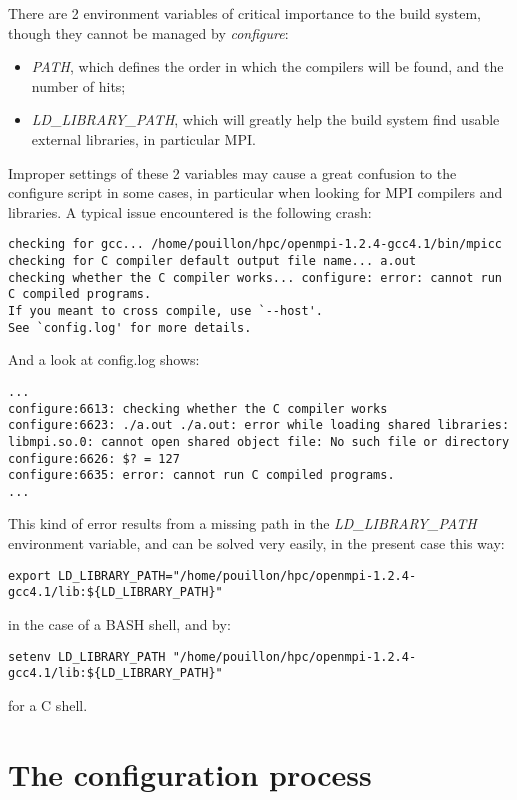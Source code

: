 There are 2 environment variables of critical importance to the build
system, though they cannot be managed by \textit{configure}: 
\begin{itemize}
\item \textit{PATH}, which defines the order in which the compilers will
be found, and the number of hits; 
\item \textit{LD\_LIBRARY\_PATH}, which will greatly help the build system
find usable external libraries, in particular MPI. 
\end{itemize}
Improper settings of these 2 variables may cause a great confusion
to the configure script in some cases, in particular when looking
for MPI compilers and libraries. A typical issue encountered is the
following crash:{\scriptsize
\begin{verbatim}
checking for gcc... /home/pouillon/hpc/openmpi-1.2.4-gcc4.1/bin/mpicc
checking for C compiler default output file name... a.out
checking whether the C compiler works... configure: error: cannot run C compiled programs.
If you meant to cross compile, use `--host'.
See `config.log' for more details.
\end{verbatim}
}And a look at config.log shows:{\scriptsize
\begin{verbatim}
...
configure:6613: checking whether the C compiler works
configure:6623: ./a.out ./a.out: error while loading shared libraries:
libmpi.so.0: cannot open shared object file: No such file or directory
configure:6626: $? = 127
configure:6635: error: cannot run C compiled programs.
...
\end{verbatim}
}

This kind of error results from a missing path in the \textit{LD\_LIBRARY\_PATH}
environment variable, and can be solved very easily, in the present
case this way:{\scriptsize
\begin{verbatim}
export LD_LIBRARY_PATH="/home/pouillon/hpc/openmpi-1.2.4-gcc4.1/lib:${LD_LIBRARY_PATH}" \end{verbatim}
}in the case of a BASH shell, and by:{\scriptsize
\begin{verbatim}
setenv LD_LIBRARY_PATH "/home/pouillon/hpc/openmpi-1.2.4-gcc4.1/lib:${LD_LIBRARY_PATH}" \end{verbatim}
}for a C shell.


\section{The configuration process}

